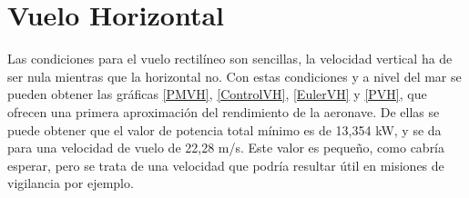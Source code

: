 \thispagestyle{empty}
\chapter{Vuelo Horizontal}

Las condiciones para el vuelo rectilíneo son sencillas, la velocidad vertical ha de ser nula mientras que la horizontal no. Con estas condiciones y a nivel del mar se pueden obtener las gráficas \ref{PMVH}, \ref{ControlVH}, \ref{EulerVH} y \ref{PVH}, que ofrecen una primera aproximación del rendimiento de la aeronave. De ellas se puede obtener que el valor de potencia total mínimo es de 13,354 kW, y se da para una velocidad de vuelo de 22,28 m/s. Este valor es pequeño, como cabría esperar, pero se trata de una velocidad que podría resultar útil en misiones de vigilancia por ejemplo.

